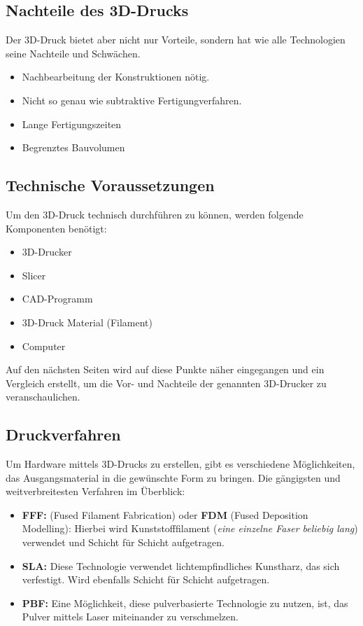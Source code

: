 \subsection{Nachteile des 3D-Drucks}
Der 3D-Druck bietet aber nicht nur Vorteile, sondern hat wie alle Technologien seine Nachteile und Schwächen.
\begin{itemize}
	\item Nachbearbeitung der Konstruktionen nötig.
	\item Nicht so genau wie subtraktive Fertigungverfahren.
	\item Lange Fertigungszeiten
	\item Begrenztes Bauvolumen
\end{itemize}
\parencite{3DDruckNachteile}

\subsection{Technische Voraussetzungen}
Um den 3D-Druck technisch durchführen zu können, werden folgende Komponenten benötigt:
\begin{itemize} 
	\item 3D-Drucker
	\item Slicer
	\item CAD-Programm
	\item 3D-Druck Material (Filament)
	\item Computer
\end{itemize}
Auf den nächsten Seiten wird auf diese Punkte näher eingegangen und ein Vergleich erstellt, um die Vor- und Nachteile \parencite{3ds} der genannten 3D-Drucker zu veranschaulichen. 


\subsection{Druckverfahren}

Um Hardware mittels 3D-Drucks zu erstellen, gibt es verschiedene Möglichkeiten, das Ausgangsmaterial \parencite{3ds} in die gewünschte Form zu bringen. Die gängigsten und weitverbreitesten Verfahren \parencite{kaffka} im Überblick: 

\begin{itemize}
	\item \textbf{FFF:} (Fused Filament Fabrication) oder \textbf{FDM} (Fused Deposition Modelling): Hierbei wird Kunststofffilament (\textit{eine einzelne Faser beliebig lang}) verwendet und Schicht für Schicht aufgetragen.
	\item \textbf{SLA:} Diese Technologie verwendet lichtempfindliches Kunstharz, das sich verfestigt. Wird ebenfalls Schicht für Schicht aufgetragen.
	\item \textbf{PBF:} Eine Möglichkeit, diese pulverbasierte Technologie zu nutzen, ist, das Pulver mittels Laser miteinander zu verschmelzen.  
\end{itemize}

